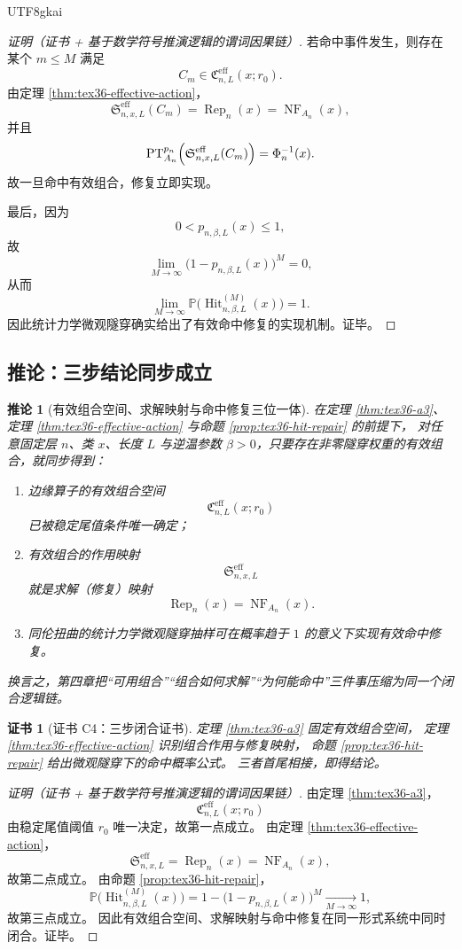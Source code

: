 \documentclass[12pt]{article}
\newtheorem{corollary}{推论}[section]
\newtheorem{Certificate}{证书}[section]
\newcommand{\PT}{\operatorname{PT}}
\newcommand{\NF}{\operatorname{NF}}
\begin{document}
\begin{CJK*}{UTF8}{gkai}
\begin{proof}[证明（证书 + 基于数学符号推演逻辑的谓词因果链）]
若命中事件发生，则存在某个 $m\le M$ 满足
\[
  C_m\in \mathfrak C_{n,L}^{\mathrm{eff}}(x;r_0).
\]
由定理 \ref{thm:tex36-effective-action}，
\[
  \mathfrak S_{n,x,L}^{\mathrm{eff}}(C_m)
  =
  \operatorname{Rep}_n(x)
  =
  \NF_{A_n}(x),
\]
并且
\[
  \PT_{A_n}^{p_n}\Bigl(
    \mathfrak S_{n,x,L}^{\mathrm{eff}}(C_m)
  \Bigr)
  =
  \Phi_n^{-1}(x).
\]
故一旦命中有效组合，修复立即实现。

最后，因为
\[
  0<p_{n,\beta,L}(x)\le 1,
\]
故
\[
  \lim_{M\to\infty}
  \bigl(1-p_{n,\beta,L}(x)\bigr)^M
  =0,
\]
从而
\[
  \lim_{M\to\infty}
  \mathbb P\bigl(
    \operatorname{Hit}_{n,\beta,L}^{(M)}(x)
  \bigr)
  =1.
\]
因此统计力学微观隧穿确实给出了有效命中修复的实现机制。证毕。
\end{proof}

\subsection{推论：三步结论同步成立}
\label{subsec:tex36-ch4-corollary}

\begin{corollary}[有效组合空间、求解映射与命中修复三位一体]
\label{cor:tex36-ch4-summary}
在定理 \ref{thm:tex36-a3}、定理 \ref{thm:tex36-effective-action} 与命题 \ref{prop:tex36-hit-repair} 的前提下，
对任意固定层 $n$、类 $x$、长度 $L$ 与逆温参数 $\beta>0$，只要存在非零隧穿权重的有效组合，就同步得到：
\begin{enumerate}
  \item 边缘算子的有效组合空间
  \[
    \mathfrak C_{n,L}^{\mathrm{eff}}(x;r_0)
  \]
  已被稳定尾值条件唯一确定；
  \item 有效组合的作用映射
  \[
    \mathfrak S_{n,x,L}^{\mathrm{eff}}
  \]
  就是求解（修复）映射
  \[
    \operatorname{Rep}_n(x)=\NF_{A_n}(x).
  \]
  \item 同伦扭曲的统计力学微观隧穿抽样可在概率趋于 $1$ 的意义下实现有效命中修复。
\end{enumerate}
换言之，第四章把“可用组合”“组合如何求解”“为何能命中”三件事压缩为同一个闭合逻辑链。
\end{corollary}

\begin{Certificate}[证书 C4：三步闭合证书]
\label{cert:tex36-c4}
定理 \ref{thm:tex36-a3} 固定有效组合空间，
定理 \ref{thm:tex36-effective-action} 识别组合作用与修复映射，
命题 \ref{prop:tex36-hit-repair} 给出微观隧穿下的命中概率公式。
三者首尾相接，即得结论。
\end{Certificate}

\begin{proof}[证明（证书 + 基于数学符号推演逻辑的谓词因果链）]
由定理 \ref{thm:tex36-a3}，
\[
  \mathfrak C_{n,L}^{\mathrm{eff}}(x;r_0)
\]
由稳定尾值阈值 $r_0$ 唯一决定，故第一点成立。
由定理 \ref{thm:tex36-effective-action}，
\[
  \mathfrak S_{n,x,L}^{\mathrm{eff}}
  =
  \operatorname{Rep}_n(x)
  =
  \NF_{A_n}(x),
\]
故第二点成立。
由命题 \ref{prop:tex36-hit-repair}，
\[
  \mathbb P\bigl(
    \operatorname{Hit}_{n,\beta,L}^{(M)}(x)
  \bigr)
  =
  1-\bigl(1-p_{n,\beta,L}(x)\bigr)^M
  \xrightarrow[M\to\infty]{}1,
\]
故第三点成立。
因此有效组合空间、求解映射与命中修复在同一形式系统中同时闭合。证毕。
\end{proof}


\end{CJK*}
\end{document}

